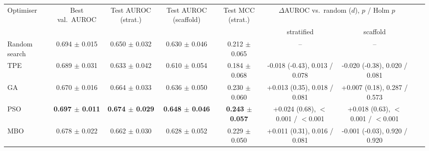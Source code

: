 \begin{tabular}{lcccccccc}
\toprule
Optimiser & Best val.\ AUROC & Test AUROC (strat.) & Test AUROC (scaffold) & Test MCC (strat.) & \multicolumn{2}{c}{$\Delta$AUROC vs.\ random ($d$), $p$ / Holm $p$} \\
\cmidrule(lr){6-7} & & & & & stratified & scaffold \\
\midrule
Random search & 0.694 $\pm$ 0.015 & 0.650 $\pm$ 0.032 & 0.630 $\pm$ 0.046 & 0.212 $\pm$ 0.065 & -- & -- \\
TPE & 0.689 $\pm$ 0.031 & 0.633 $\pm$ 0.042 & 0.610 $\pm$ 0.054 & 0.184 $\pm$ 0.068 & -0.018 (-0.43), 0.013 / 0.078 & -0.020 (-0.38), 0.020 / 0.081 \\
GA & 0.670 $\pm$ 0.016 & 0.664 $\pm$ 0.033 & 0.636 $\pm$ 0.050 & 0.230 $\pm$ 0.060 & +0.013 (0.35), 0.018 / 0.081 & +0.007 (0.18), 0.287 / 0.573 \\
PSO & \textbf{0.697 $\pm$ 0.011} & \textbf{0.674 $\pm$ 0.029} & \textbf{0.648 $\pm$ 0.046} & \textbf{0.243 $\pm$ 0.057} & +0.024 (0.68), $<$0.001 / $<$0.001 & +0.018 (0.63), $<$0.001 / $<$0.001 \\
MBO & 0.678 $\pm$ 0.022 & 0.662 $\pm$ 0.030 & 0.628 $\pm$ 0.052 & 0.229 $\pm$ 0.050 & +0.011 (0.31), 0.016 / 0.081 & -0.001 (-0.03), 0.920 / 0.920 \\
\bottomrule
\end{tabular}